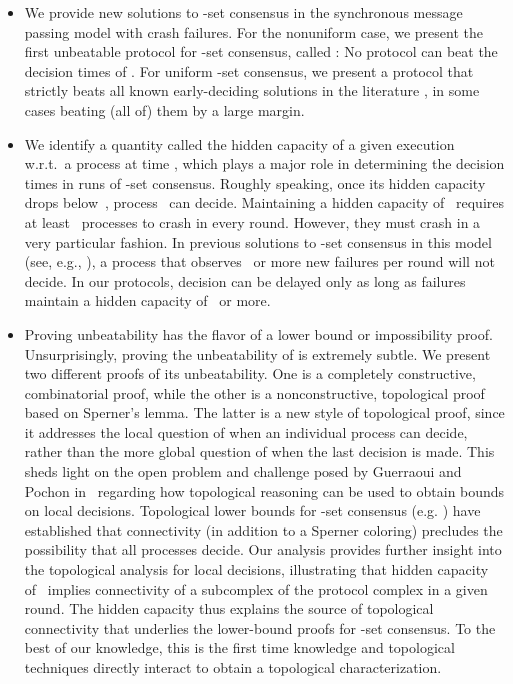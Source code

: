 \documentclass[11pt]{article}
\theoremstyle{definition}
\begin{document}
\begin{itemize}
\item We provide new solutions to -set
consensus
in the synchronous message passing model with crash failures. For the nonuniform case, we present the first unbeatable protocol for -set consensus, called : No protocol can
beat the decision times of
.
For uniform -set consensus, we present a protocol  that strictly
beats
all known early-deciding solutions in the literature \cite{AGGT, CHLT, GGP,GHP, RRT}, in some cases beating (all of) them by a large margin.

\item We identify a quantity called the hidden capacity
of
a given execution
w.r.t.\ a process  at time ,
which plays a major role in determining the decision times in runs of -set consensus. Roughly speaking, once its hidden capacity drops below~, process~ can decide. Maintaining a hidden capacity of~ requires at least~ processes to crash in every round. However, they must crash in a very particular fashion. In previous solutions to -set consensus in this model (see, e.g., \cite{GGP}),
a process that observes~ or more new failures per round will not decide. In our protocols,
decision can be delayed only as long as failures maintain a hidden capacity of~ or more.
\item Proving unbeatability has the flavor of a lower bound or impossibility proof.
Unsurprisingly, proving
the unbeatability of 
is extremely subtle. We present two different proofs of its unbeatability. One is a completely constructive, combinatorial proof, while the other is a nonconstructive, topological proof based on Sperner's lemma.
The latter is a new style of topological proof, since it addresses the local question of when an individual process can decide, rather than  the more global question of when the last decision is made.
This sheds light on the open problem and challenge posed by Guerraoui and Pochon in~\cite{GP09} regarding how topological reasoning can be used to obtain bounds on local decisions.
Topological lower bounds for -set consensus (e.g. \cite{CHLT,GHP}) have established that  connectivity (in addition to a Sperner coloring) precludes the possibility that all processes decide.
Our analysis provides further insight into the topological analysis for local decisions, illustrating  that hidden capacity of~ implies
 connectivity of a subcomplex of the protocol complex in a given round.
 The hidden capacity thus explains the source of topological connectivity that underlies the lower-bound proofs for -set consensus.
 To the best of our knowledge, this is the first time knowledge and topological techniques directly interact to obtain a topological characterization.
\end{itemize}
\end{document}
